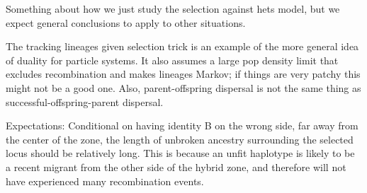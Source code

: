\documentclass[12pt]{article}
\begin{document}
Something about how we just study the selection against hets model,
but we expect general conclusions to apply to other situations.

The tracking lineages given selection trick is an example of the more general idea of duality for particle systems.
It also assumes a large pop density limit that excludes recombination and makes lineages Markov;
if things are very patchy this might not be a good one.
Also, parent-offspring dispersal is not the same thing as successful-offspring-parent dispersal.

Expectations:
Conditional  on having identity B on the wrong side, far away from the center of the zone, the length of unbroken ancestry surrounding the selected locus should be relatively long. This is because an unfit haplotype is likely to be a recent migrant from the other side of the hybrid zone, and therefore will not have experienced many recombination events. 



\end{document}
